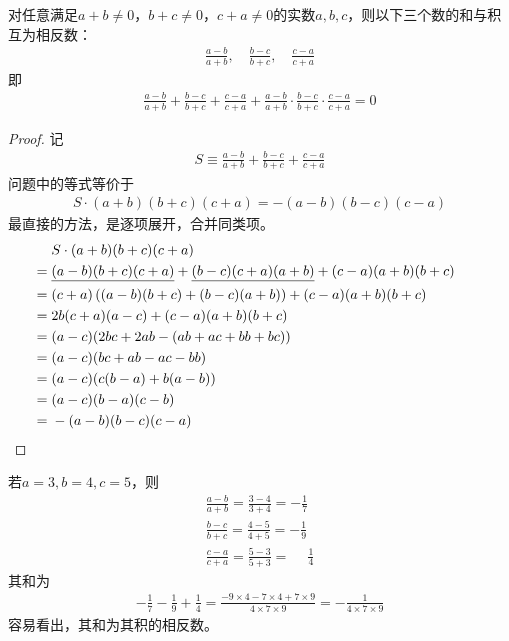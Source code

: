 \begin{example}\label{ex:sum-is-negative-to-product}
  对任意满足$a+b\ne0$，$b+c\ne0$，$c+a\ne0$的实数$a,b,c$，则以下三个数的和与积互为相反数：
  \begin{align*}
    \frac{a-b}{a+b},\quad \frac{b-c}{b+c},\quad \frac{c-a}{c+a}
  \end{align*}
  即
  \begin{align*}
    \frac{a-b}{a+b} + \frac{b-c}{b+c} + \frac{c-a}{c+a} 
    + \frac{a-b}{a+b} \cdot \frac{b-c}{b+c} \cdot \frac{c-a}{c+a} = 0
  \end{align*}
\end{example}
\begin{proof}
  记
  \begin{align*}
    S\equiv \frac{a-b}{a+b} + \frac{b-c}{b+c} + \frac{c-a}{c+a}
  \end{align*}
  问题中的等式等价于
  \begin{align*}
    S \cdot (a+b)(b+c)(c+a) = -(a-b)(b-c)(c-a)
  \end{align*}
  最直接的方法，是逐项展开，合并同类项。
  \begin{align*}
       & S\cdot (a+b)(b+c)(c+a)\\
    ={}& \underline{(a-b)(b+c)(c+a)} + \underline{(b-c)(c+a)(a+b)} + (c-a)(a+b)(b+c)\\
    ={}& (c+a)\left( (a-b)(b+c) + (b-c)(a+b) \right) + (c-a)(a+b)(b+c)\\
    ={}& 2b(c+a)(a-c) + (c-a)(a+b)(b+c)\\
    ={}& (a-c)(2bc+2ab - (ab+ac+bb+bc))\\
    ={}& (a-c)(bc+ab - ac-bb)\\
    ={}& (a-c)(c(b-a)+b(a-b))\\
    ={}& (a-c)(b-a)(c-b)\\
    ={}& -(a-b)(b-c)(c-a) &&\qedhere
  \end{align*}
\end{proof}

\begin{example}
  若$a=3,b=4,c=5$，则
  \begin{align*}
    \frac{a-b}{a+b} = \frac{3-4}{3+4} = -\frac17\\
    \frac{b-c}{b+c} = \frac{4-5}{4+5} = -\frac19\\
    \frac{c-a}{c+a} = \frac{5-3}{5+3} = \phantom{-}\frac14
  \end{align*}
  其和为
  \begin{align*}
    -\frac17 - \frac19 + \frac14 = \frac{-9\times4 - 7\times4 + 7\times9}{4\times7\times9} = -\frac1{4\times7\times9}
  \end{align*}
  容易看出，其和为其积的相反数。
\end{example}

